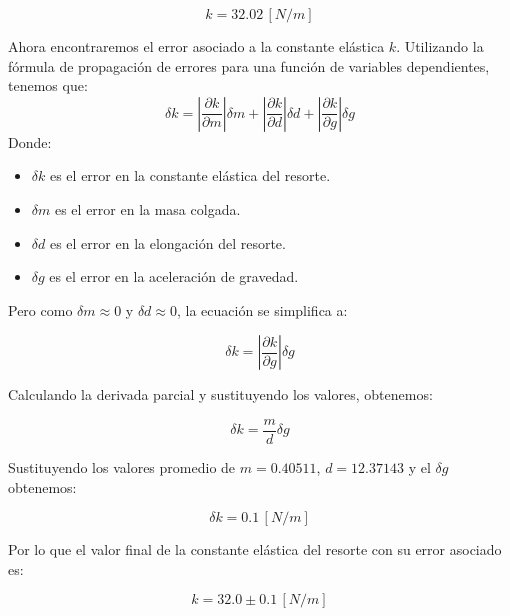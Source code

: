 \documentclass{article}
\begin{document}
\begin{multicols}{2}
        \begin{equation}
            k = 32.02 \, [N/m]
        \end{equation}

        Ahora encontraremos el error asociado a la constante elástica $k$. Utilizando la fórmula de propagación de errores
        para una función de variables dependientes, tenemos que:
        \begin{equation}
            \delta k = \left|\dfrac{\partial k}{\partial m}\right| \delta m + \left|\dfrac{\partial k}{\partial d}\right| \delta d + \left|\dfrac{\partial k}{\partial g}\right| \delta g
        \end{equation}
        Donde:
        \begin{itemize}
            \item $\delta k$ es el error en la constante elástica del resorte.
            \item $\delta m$ es el error en la masa colgada.
            \item $\delta d$ es el error en la elongación del resorte.
            \item $\delta g$ es el error en la aceleración de gravedad.
        \end{itemize}

        Pero como $\delta m \approx 0$ y $\delta d \approx 0$, la ecuación se simplifica a:
        
        \begin{equation}
            \delta k = \left|\dfrac{\partial k}{\partial g}\right| \delta g
        \end{equation}

        Calculando la derivada parcial y sustituyendo los valores, obtenemos:

        \begin{equation}
            \delta k = \dfrac{m}{d} \delta g
        \end{equation}

        Sustituyendo los valores promedio de $m = 0.40511$, $d = 12.37143$ y el $\delta g$ obtenemos:

        \begin{equation}
            \delta k = 0.1 \, [N/m]
        \end{equation}

        Por lo que el valor final de la constante elástica del resorte con su error asociado es:

        \begin{equation}
            k = 32.0 \pm 0.1 \, [N/m]
        \end{equation}


\end{multicols}
\end{document}
